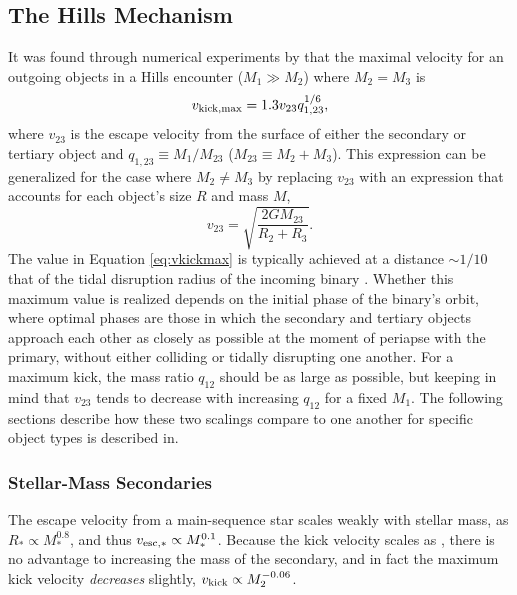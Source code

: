 \documentclass[a4paper,twocolumn]{emulateapj}
\begin{document}
\subsection{The Hills Mechanism}

It was found through numerical experiments by \citet{Sari:2010a} that the maximal velocity for an outgoing objects in a Hills encounter ($M_{1} \gg M_{2}$) where $M_{2} = M_{3}$ is
\begin{equation}
v_{\rm kick,\max} = 1.3 v_{23} q_{1,23}^{1/6}\label{eq:vkickmax},
\end{equation}
where $v_{23}$ is the escape velocity from the surface of either the secondary or tertiary object and $q_{1,23} \equiv M_{1}/M_{23}$ ($M_{23} \equiv M_{2} + M_{3}$). This expression can be generalized for the case where $M_{2} \neq M_{3}$ by replacing $v_{23}$ with an expression that accounts for each object's size $R$ and mass $M$,
\begin{equation}
v_{23} = \sqrt{\frac{2 G M_{23}}{R_{2} + R_{3}}}.
\end{equation}
The value in Equation \ref{eq:vkickmax} is typically achieved at a distance $\sim 1/10$ that of the tidal disruption radius of the incoming binary  \citep{Sari:2010a}. Whether this maximum value is realized depends on the initial phase of the binary's orbit, where optimal phases are those in which the secondary and tertiary objects approach each other as closely as possible at the moment of periapse with the primary, without either colliding or tidally disrupting one another. For a maximum kick, the mass ratio $q_{12}$ should be as large as possible, but keeping in mind that $v_{23}$ tends to decrease with increasing $q_{12}$ for a fixed $M_{1}$. The following sections describe how these two scalings compare to one another for specific object types is described in.

\subsubsection{Stellar-Mass Secondaries}
The escape velocity from a main-sequence star scales weakly with stellar mass, as $R_\ast \propto M_\ast^{0.8}$, and thus $v_{\rm esc,\ast} \propto M_\ast^{0.1}$. Because the kick velocity scales as , there is no advantage to increasing the mass of the secondary, and in fact the maximum kick velocity {\it decreases} slightly, $v_{\rm kick} \propto M_2^{-0.06}$.
\end{document}
